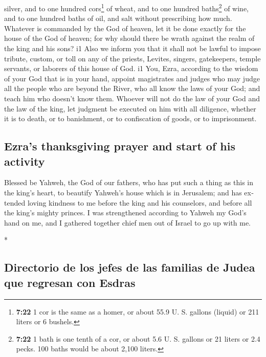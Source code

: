 \begin{paracol}{2}
\begin{otherlanguage}{english}
silver, and to one hundred cors\footnote{\textbf{7:22} 1 cor is the same
  as a homer, or about 55.9 U. S. gallons (liquid) or 211 liters or 6
  bushels.} of wheat, and to one hundred baths\footnote{\textbf{7:22} 1
  bath is one tenth of a cor, or about 5.6 U. S. gallons or 21 liters or
  2.4 pecks. 100 baths would be about 2,100 liters.} of wine, and to one
hundred baths of oil, and salt without prescribing how much.
 Whatever is commanded by the God of heaven, let it be
done exactly for the house of the God of heaven; for why should there be
wrath against the realm of the king and his sons? i1 
Also we inform you that it shall not be lawful to impose tribute,
custom, or toll on any of the priests, Levites, singers, gatekeepers,
temple servants, or laborers of this house of God. i1 
You, Ezra, according to the wisdom of your God that is in your hand,
appoint magistrates and judges who may judge all the people who are
beyond the River, who all know the laws of your God; and teach him who
doesn't know them.  Whoever will not do the law of your
God and the law of the king, let judgment be executed on him with all
diligence, whether it is to death, or to banishment, or to confiscation
of goods, or to imprisonment.

\hypertarget{ezras-thanksgiving-prayer-and-start-of-his-activity}{%
\subsection{Ezra's thanksgiving prayer and start of his
activity}\label{ezras-thanksgiving-prayer-and-start-of-his-activity}}

 Blessed be Yahweh, the God of our fathers, who has put
such a thing as this in the king's heart, to beautify Yahweh's house
which is in Jerusalem;  and has extended loving kindness
to me before the king and his counselors, and before all the king's
mighty princes. I was strengthened according to Yahweh my God's hand on
me, and I gathered together chief men out of Israel to go up with me.

\end{otherlanguage}

\switchcolumn[0]*

\hypertarget{directorio-de-los-jefes-de-las-familias-de-judea-que-regresan-con-esdras}{%
\subsection{Directorio de los jefes de las familias de Judea que
regresan con
Esdras}\label{directorio-de-los-jefes-de-las-familias-de-judea-que-regresan-con-esdras}}


\end{paracol}

